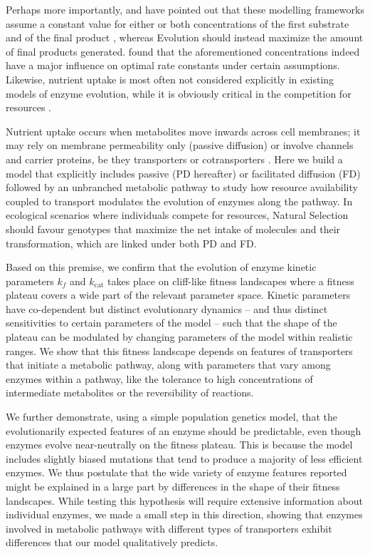 Perhaps more importantly, \citet{Heinrich91} and \citet{Schuster08} have pointed out that these modelling frameworks assume a constant value for either or both concentrations of the first substrate and of the final product \citep{Orth10}, whereas Evolution should instead maximize the amount of final products generated. \citet{Klipp94} found that the aforementioned concentrations indeed have a major influence on optimal rate constants under certain assumptions. 
Likewise, nutrient uptake is most often not considered explicitly in existing models of enzyme evolution, while it is obviously critical in the competition for resources \citep{Dykhuizen94}. 

Nutrient uptake occurs when metabolites move inwards across cell membranes; it may rely on membrane permeability only (passive diffusion) or involve channels and carrier proteins, be they transporters or cotransporters \citep{Stein86a}.
Here we build a model that explicitly includes passive (PD hereafter) or facilitated diffusion (FD) followed by an unbranched metabolic pathway to study how resource availability coupled to transport modulates the evolution of enzymes along the pathway.
In ecological scenarios where individuals compete for resources, Natural Selection should favour genotypes that maximize the net intake of molecules and their transformation, which are linked under both PD and FD.

Based on this premise, we confirm that the evolution of enzyme kinetic parameters $k_f$ and $k_\text{cat}$ takes place on cliff-like fitness landscapes where a fitness plateau covers a wide part of the relevant parameter space. Kinetic parameters have co-dependent but distinct evolutionary dynamics -- and thus distinct sensitivities to certain parameters of the model -- such that the shape of the plateau can be modulated by changing parameters of the model within realistic ranges. We show that this fitness landscape depends on features of transporters that initiate a metabolic pathway, along with parameters that vary among enzymes within a pathway, like the tolerance to high concentrations of intermediate metabolites or the reversibility of reactions.

We further demonstrate, using a simple population genetics model, that the evolutionarily expected features of an enzyme should be predictable, even though enzymes evolve near-neutrally on the fitness plateau. This is because the model includes slightly biased mutations that tend to produce a majority of less efficient enzymes. We thus postulate that the wide variety of enzyme features reported might be explained in a large part by differences in the shape of their fitness landscapes. While testing this hypothesis will require extensive information about individual enzymes, we made a small step in this direction, showing that enzymes involved in metabolic pathways with different types of transporters exhibit differences that our model qualitatively predicts.  

